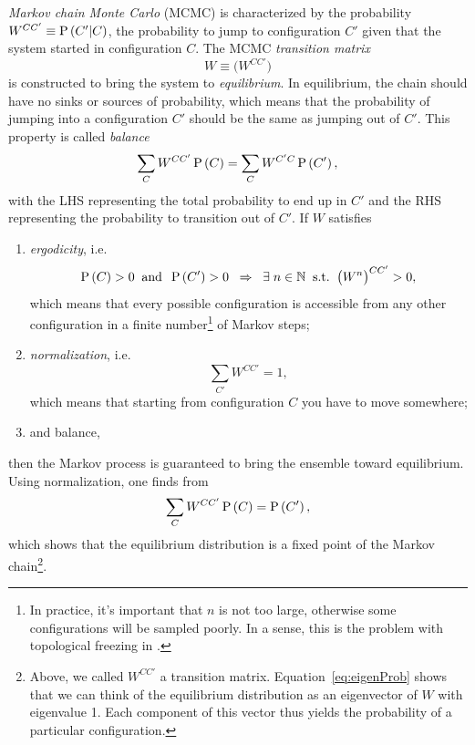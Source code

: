 {\it Markov chain Monte Carlo} (MCMC) is characterized by the probability 
$W^{CC'}\equiv\operatorname{P}\left(C'|C\right)$, the probability to jump to configuration 
$C'$ given that the system started in configuration $C$.
The MCMC {\it transition matrix}
\begin{equation}
  W\equiv\Big(W^{CC'}\Big)
\end{equation}
is constructed to bring the system to {\it equilibrium}.
In equilibrium, the chain should have no sinks or sources of probability,
which means that the probability of jumping into a configuration $C'$
should be the same as jumping out of $C'$. This property
is called {\it balance}
\begin{equation}\label{eq:balance}
    \sum\limits_CW^{CC'}\operatorname{P}\left(C\right)=
    \sum\limits_CW^{C'C}\operatorname{P}\left(C'\right),
\end{equation}
with the LHS representing the total probability to end up in $C'$ and
the RHS representing the probability to transition out of $C'$.
If $W$ satisfies
\begin{enumerate}
  \item {\it ergodicity}, i.e.
        \begin{equation}\label{eq:ergodicity}
          \operatorname{P}\left(C\right)>0\;\;\text{and}\;\;\operatorname{P}\left(C'\right)>0\;\;\Rightarrow\;\;
          \exists\;n\in\mathbb{N}\;\;\text{s.t.}\;\;\big(W^n\big)^{CC'}>0,
        \end{equation}
        which means that every possible configuration is accessible from
        any other configuration in a finite number\footnote{In practice,
        it's important that $n$ is not too large, otherwise some configurations
        will be sampled poorly. In a sense, this is the problem with
        topological freezing
        in .} of Markov steps;
  \item {\it normalization}, i.e.
        \begin{equation}
          \sum\limits_{C'}W^{CC'}=1,
        \end{equation}
        which means that starting from configuration $C$ you have
        to move somewhere;
  \item and balance, 
\end{enumerate}
then the Markov process is guaranteed to bring the ensemble toward 
equilibrium. Using normalization, one finds from 
\begin{equation}\label{eq:eigenProb}
    \sum\limits_CW^{CC'}\operatorname{P}\left(C\right)=\operatorname{P}\left(C'\right),
\end{equation}
which shows that the equilibrium distribution is a fixed point of
the Markov chain\footnote{Above, we called $W^{CC'}$ a transition matrix.
Equation~\eqref{eq:eigenProb} shows that we can think of the equilibrium
distribution as an eigenvector of $W$ with eigenvalue 1. Each component
of this vector thus yields the probability of a particular configuration.}. 


